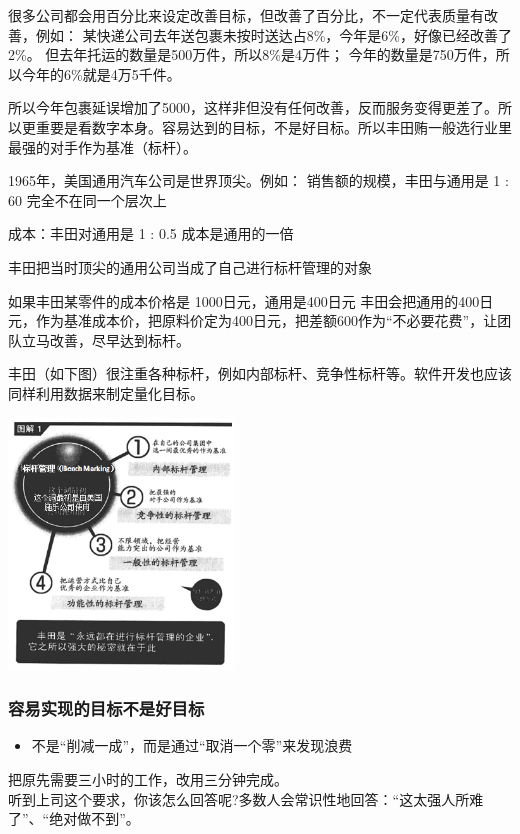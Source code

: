 很多公司都会用百分比来设定改善目标，但改善了百分比，不一定代表质量有改善，例如：
某快递公司去年送包裹未按时送达占8\%，今年是6\%，好像已经改善了2\%。
但去年托运的数量是500万件，所以8\%是4万件；
今年的数量是750万件，所以今年的6\%就是4万5千件。

所以今年包裹延误增加了5000，这样非但没有任何改善，反而服务变得更差了。所以更重要是看数字本身。容易达到的目标，不是好目标。所以丰田贿一般选行业里最强的对手作为基准（标杆）。

1965年，美国通用汽车公司是世界顶尖。例如： 销售额的规模，丰田与通用是 1
: 60 完全不在同一个层次上

成本：丰田对通用是 1 : 0.5 成本是通用的一倍

丰田把当时顶尖的通用公司当成了自己进行标杆管理的对象

如果丰田某零件的成本价格是 1000日元，通用是400日元
丰田会把通用的400日元，作为基准成本价，把原料价定为400日元，把差额600作为``不必要花费''，让团队立马改善，尽早达到标杆。

丰田（如下图）很注重各种标杆，例如内部标杆、竞争性标杆等。软件开发也应该同样利用数据来制定量化目标。

\includegraphics[width=6cm]{丰田p1.png}

\hypertarget{ux5bb9ux6613ux5b9eux73b0ux7684ux76eeux6807ux4e0dux662fux597dux76eeux6807}{%
\subsubsection{容易实现的目标不是好目标}\label{ux5bb9ux6613ux5b9eux73b0ux7684ux76eeux6807ux4e0dux662fux597dux76eeux6807}}

\begin{itemize}
\tightlist
\item
  不是``削减一成''，而是通过``取消一个零''来发现浪费
\end{itemize}

把原先需要三小时的工作，改用三分钟完成。\\
听到上司这个要求，你该怎么回答呢?多数人会常识性地回答：``这太强人所难了''、``绝对做不到''。\\

